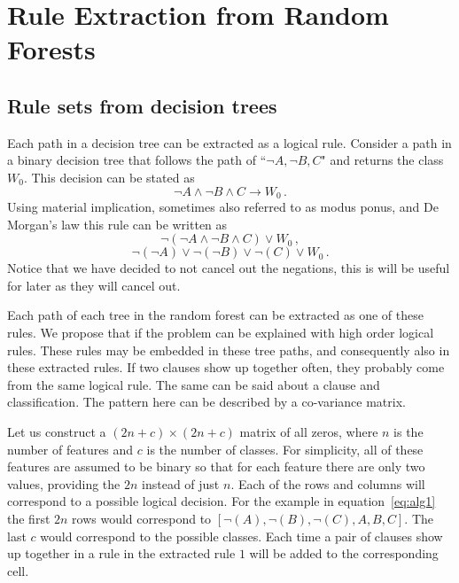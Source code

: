 \documentclass[twoside,11pt]{article}
\begin{document}
\section{Rule Extraction from Random Forests}
\label{sec:alg}
\subsection{Rule sets from decision trees}
Each path in a decision tree can be extracted as a logical rule. Consider a path in a binary decision tree that follows the path of ``$\neg A, \neg B, C$" and returns the class $W_0$. This decision can be stated as 
\[\neg A \land \neg B \land C \rightarrow W_0 \,.\]
Using material implication, sometimes also referred to as modus ponus, and De Morgan's law this rule can be written as 
\[\neg\left(\neg A \land \neg B \land C\right) \lor W_0 \, , \]
\begin{equation}
\neg(\neg A) \lor \neg (\neg B) \lor \neg(C) \lor W_0 \, .
\label{eq:alg1}
\end{equation}
Notice that we have decided to not cancel out the negations, this is will be useful for later as they will cancel out. 

Each path of each tree in the random forest can be extracted as one of these rules. We propose that if the problem can be explained with high order logical rules. These rules may be embedded in these tree paths, and consequently also in these extracted rules. If two clauses show up together often, they probably come from the same logical rule. The same can be said about a clause and classification. The pattern here can be described by a co-variance matrix. 

Let us construct a $(2n +c) \times (2n+c)$ matrix of all zeros, where $n$ is the number of features and $c$ is the number of classes. For simplicity, all of these features are assumed to be binary so that for each feature there are only two values, providing the $2n$ instead of just $n$. Each of the rows and columns will correspond to a possible logical decision. For the example in equation~\ref{eq:alg1} the first $2n$ rows would correspond to $[\neg(A), \neg(B), \neg(C), A, B, C]$. The last $c$ would correspond to the possible classes. Each time a pair of clauses show up together in a rule in the extracted rule $1$ will be added to the corresponding cell. 
\end{document}
